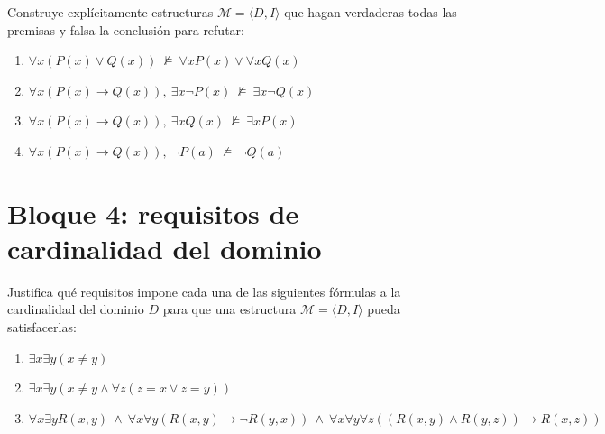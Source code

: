 \begin{pregunta}\label{e5-8}
Construye explícitamente estructuras $\mathcal{M} = \langle D, I \rangle$ que hagan verdaderas todas las premisas y falsa la conclusión para refutar:
\begin{enumerate}
    \item $\forall x (P(x) \lor Q(x)) \ \not\models \ \forall x P(x) \lor \forall x Q(x)$
    \item $\forall x (P(x) \to Q(x)), \ \exists x \neg P(x) \ \not\models \ \exists x \neg Q(x)$
    \item $\forall x (P(x) \to Q(x)), \ \exists x Q(x) \ \not\models \ \exists x P(x)$
    \item $\forall x (P(x) \to Q(x)), \ \neg P(a) \ \not\models \ \neg Q(a)$
\end{enumerate}
\end{pregunta}

\section*{Bloque 4: requisitos de cardinalidad del dominio}

\begin{pregunta}\label{e5-9}
Justifica qué requisitos impone cada una de las siguientes fórmulas a la cardinalidad del dominio $D$ para que una estructura $\mathcal{M} = \langle D, I \rangle$ pueda satisfacerlas:
\begin{enumerate}
    \item $\exists x \exists y (x \neq y)$
    \item $\exists x \exists y (x \neq y \land \forall z (z = x \lor z = y))$
    \item $\forall x \exists y R(x, y) \ \land \ \forall x \forall y (R(x, y) \to \neg R(y, x)) \ \land \ \forall x \forall y \forall z ((R(x, y) \land R(y, z)) \to R(x, z))$
\end{enumerate}
\end{pregunta}

